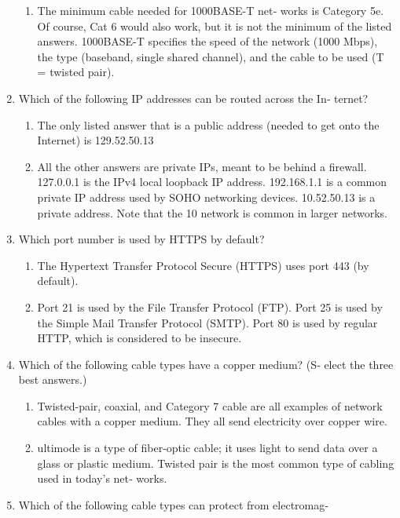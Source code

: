 \documentclass{article}
\begin{document}
\begin{enumerate}
    \begin{enumerate}
        \item The minimum cable needed for 1000BASE-T net‐
works is Category 5e. Of course, Cat 6 would also work, but it is
not the minimum of the listed answers. 1000BASE-T specifies
the speed of the network (1000 Mbps), the type (baseband, single
shared channel), and the cable to be used (T = twisted pair).
    \end{enumerate}
    \item Which of the following IP addresses can be routed across the In‐
ternet?
    \begin{enumerate}
        \item The only listed answer that is a public address
(needed to get onto the Internet) is 129.52.50.13
        \item All the other answers are private IPs, meant
to be behind a firewall. 127.0.0.1 is the IPv4 local loopback IP
address. 192.168.1.1 is a common private IP address used by
SOHO networking devices. 10.52.50.13 is a private address.
Note that the 10 network is common in larger networks.
    \end{enumerate}
    \item Which port number is used by HTTPS by default?
    \begin{enumerate}
        \item The Hypertext Transfer Protocol Secure (HTTPS)
uses port 443 (by default).
        \item Port 21 is used by the File Transfer Protocol
(FTP). Port 25 is used by the Simple Mail Transfer Protocol
(SMTP). Port 80 is used by regular HTTP, which is considered to
be insecure.
    \end{enumerate}
    \item Which of the following cable types have a copper medium? (S‐
elect the three best answers.)
    \begin{enumerate}
        \item Twisted-pair, coaxial, and Category 7 cable are all
examples of network cables with a copper medium. They all send
electricity over copper wire. 
        \item ultimode is a type of fiber-optic cable; it
uses light to send data over a glass or plastic medium. Twisted
pair is the most common type of cabling used in today’s net‐
works.
    \end{enumerate}
    \item Which of the following cable types can protect from electromag‐

\end{enumerate}
\end{document}
